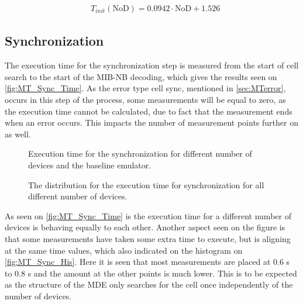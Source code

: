 \begin{align}
&T_{init} (\text{NoD}) = 0.0942 \cdot \text{NoD} + 1.526 
\end{align}
\begin{where}
\end{where}


\subsection{Synchronization}
The execution time for the synchronization step is measured from the start of cell search to the start of the MIB-NB decoding, which gives the results seen on \autoref{fig:MT_Sync_Time}. As the error type cell sync, mentioned in \autoref{sec:MTerror}, occurs in this step of the process, some measurements will be equal to zero, as the execution time cannot be calculated, due to fact that the measurement ends when an error occurs. This impacts the number of measurement points further on as well.

\captionsetup{belowskip=0em}
\begin{minipage}{0.48\textwidth}
\begin{figure}[H]
\centering
\resizebox{\textwidth}{!}{
}
\caption{Execution time for the synchronization for different number of devices and the baseline emulator.}
\label{fig:MT_Sync_Time}
\end{figure}
\end{minipage}%
\hfill
\begin{minipage}{0.48\textwidth}
\begin{figure}[H]
\centering
\resizebox{\textwidth}{!}{
}
\caption{The distribution for the execution time for synchronization for all different number of devices.}
\label{fig:MT_Sync_His}
\end{figure}
\end{minipage}
\captionsetup{belowskip=-1.5em}

As seen on \autoref{fig:MT_Sync_Time} is the execution time for a different number of devices is behaving equally to each other. Another aspect seen on the figure is that some measurements have taken some extra time to execute, but is aligning at the same time values, which also indicated on the histogram on \autoref{fig:MT_Sync_His}. Here it is seen that most measurements are placed at 0.6 s to 0.8 s and the amount at the other points is much lower. This is to be expected as the structure of the MDE only searches for the cell once independently of the number of devices.



